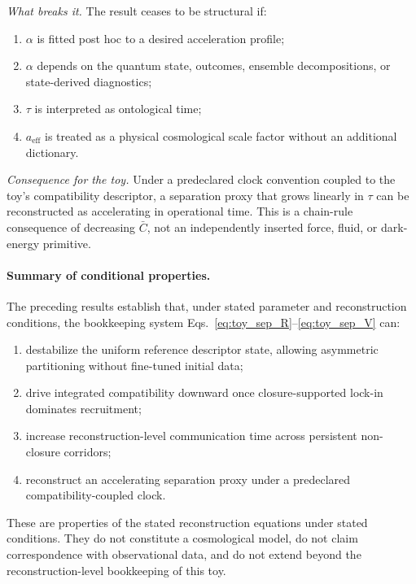 \documentclass[aps,prx,onecolumn,11pt]{revtex4-2}
\theoremstyle{plain}
\theoremstyle{definition}
\theoremstyle{remark}
\begin{document}
\emph{What breaks it.}
The result ceases to be structural if:
\begin{enumerate}[label=(\roman*), leftmargin=2.2em]
\item \(\alpha\) is fitted post hoc to a desired acceleration profile;
\item \(\alpha\) depends on the quantum state, outcomes, ensemble
decompositions, or state-derived diagnostics;
\item \(\tau\) is interpreted as ontological time;
\item \(a_{\mathrm{eff}}\) is treated as a physical cosmological scale
factor without an additional dictionary.
\end{enumerate}

\emph{Consequence for the toy.}
Under a predeclared clock convention coupled to the toy's compatibility
descriptor, a separation proxy that grows linearly in \(\tau\) can be
reconstructed as accelerating in operational time. This is a
chain-rule consequence of decreasing \(\bar C\), not an independently
inserted force, fluid, or dark-energy primitive.


\paragraph{Summary of conditional properties.}

The preceding results establish that, under stated parameter and
reconstruction conditions, the bookkeeping system
Eqs.~\eqref{eq:toy_sep_R}--\eqref{eq:toy_sep_V} can:

\begin{enumerate}
\item destabilize the uniform reference descriptor state, allowing
asymmetric partitioning without fine-tuned initial data;
\item drive integrated compatibility downward once closure-supported
lock-in dominates recruitment;
\item increase reconstruction-level communication time across persistent
non-closure corridors;
\item reconstruct an accelerating separation proxy under a predeclared
compatibility-coupled clock.
\end{enumerate}

These are properties of the stated reconstruction equations under stated
conditions. They do not constitute a cosmological model, do not claim
correspondence with observational data, and do not extend beyond the
reconstruction-level bookkeeping of this toy.
\end{document}
